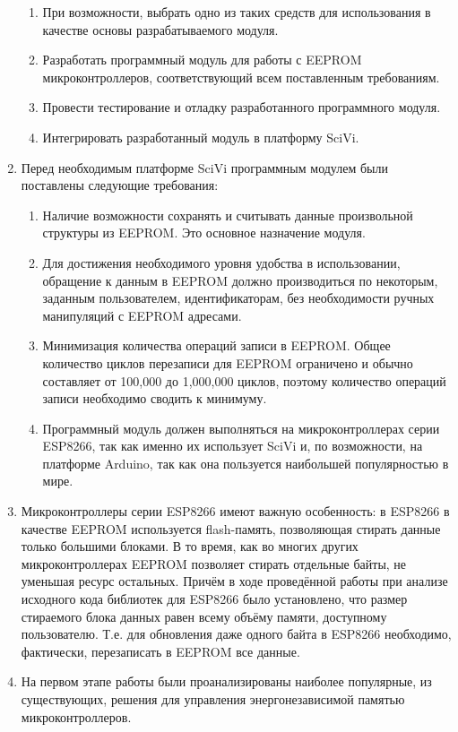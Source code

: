 \documentclass[14pt]{extarticle}
\begin{document}
\begin{enumerate}
\begin{enumerate}
		\item При возможности, выбрать одно из таких средств для использования в качестве основы разрабатываемого модуля.
		\item Разработать программный модуль для работы с EEPROM микроконтроллеров, соответствующий всем поставленным требованиям.
		\item Провести тестирование и отладку разработанного программного модуля.
		\item Интегрировать разработанный модуль в платформу SciVi.
	\end{enumerate}
	\item Перед необходимым платформе SciVi программным модулем были поставлены следующие требования:
	\begin{enumerate}
		\item Наличие возможности сохранять и считывать данные произвольной структуры из EEPROM.
		Это основное назначение модуля.
		\item Для достижения необходимого уровня удобства в использовании, обращение к данным в EEPROM должно производиться по некоторым, заданным пользователем, идентификаторам, без необходимости ручных манипуляций с EEPROM адресами.
		\item Минимизация количества операций записи в EEPROM.
		Общее количество циклов перезаписи для EEPROM ограничено и обычно составляет от 100,000 до 1,000,000 циклов, поэтому количество операций записи необходимо сводить к минимуму.
		\item  Программный модуль должен выполняться на микроконтроллерах серии ESP8266, так как именно их использует SciVi и, по возможности, на платформе Arduino, так как она пользуется наибольшей популярностью в мире.
	\end{enumerate}
	\item Микроконтроллеры серии ESP8266 имеют важную особенность: в ESP8266 в качестве EEPROM используется flash-память, позволяющая стирать данные только большими блоками.
	В то время, как во многих других микроконтроллерах EEPROM позволяет стирать отдельные байты, не уменьшая ресурс остальных.
	Причём в ходе проведённой работы при анализе исходного кода библиотек для ESP8266 было установлено, что размер стираемого блока данных равен всему объёму памяти, доступному пользователю.
	Т.е. для обновления даже одного байта в ESP8266 необходимо, фактически, перезаписать в EEPROM все данные.
	\item На первом этапе работы были проанализированы наиболее популярные, из существующих, решения для управления энергонезависимой памятью микроконтроллеров.

\end{enumerate}
\end{document}
